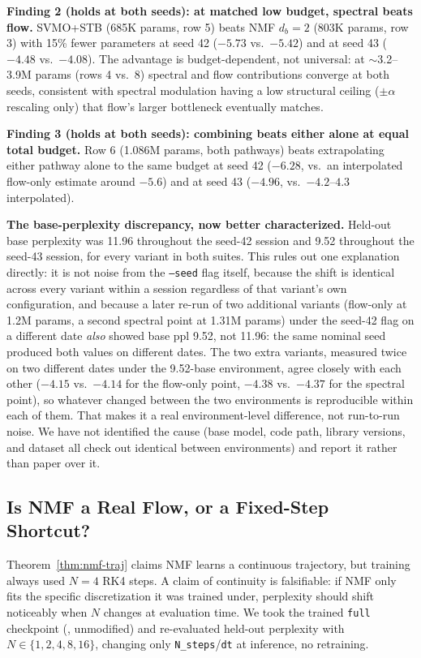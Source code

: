 \documentclass{scpe}
\begin{document}
\textbf{Finding 2 (holds at both seeds): at matched low budget, spectral beats flow.} SVMO+STB (685K params, row 5) beats NMF $d_b{=}2$ (803K params, row 3) with 15\% fewer parameters at seed 42 ($-5.73$ vs.\ $-5.42$) and at seed 43 ($-4.48$ vs.\ $-4.08$). The advantage is budget-dependent, not universal: at $\sim$3.2--3.9M params (rows 4 vs.\ 8) spectral and flow contributions converge at both seeds, consistent with spectral modulation having a low structural ceiling ($\pm\alpha$ rescaling only) that flow's larger bottleneck eventually matches.

\textbf{Finding 3 (holds at both seeds): combining beats either alone at equal total budget.} Row 6 (1.086M params, both pathways) beats extrapolating either pathway alone to the same budget at seed 42 ($-6.28$, vs.\ an interpolated flow-only estimate around $-5.6$) and at seed 43 ($-4.96$, vs.\ $-4.2$--$4.3$ interpolated).

\textbf{The base-perplexity discrepancy, now better characterized.} Held-out base perplexity was 11.96 throughout the seed-42 session and 9.52 throughout the seed-43 session, for every variant in both suites. This rules out one explanation directly: it is not noise from the \texttt{--seed} flag itself, because the shift is identical across every variant within a session regardless of that variant's own configuration, and because a later re-run of two additional variants (flow-only at 1.2M params, a second spectral point at 1.31M params) under the seed-42 flag on a different date \emph{also} showed base ppl 9.52, not 11.96: the same nominal seed produced both values on different dates. The two extra variants, measured twice on two different dates under the 9.52-base environment, agree closely with each other ($-4.15$ vs.\ $-4.14$ for the flow-only point, $-4.38$ vs.\ $-4.37$ for the spectral point), so whatever changed between the two environments is reproducible within each of them. That makes it a real environment-level difference, not run-to-run noise. We have not identified the cause (base model, code path, library versions, and dataset all check out identical between environments) and report it rather than paper over it.

\subsection{Is NMF a Real Flow, or a Fixed-Step Shortcut?}
\label{sec:ode-invariance}

Theorem~\ref{thm:nmf-traj} claims NMF learns a continuous trajectory, but training always used $N{=}4$ RK4 steps. A claim of continuity is falsifiable: if NMF only fits the specific discretization it was trained under, perplexity should shift noticeably when $N$ changes at evaluation time. We took the trained \texttt{full} checkpoint (, unmodified) and re-evaluated held-out perplexity with $N \in \{1,2,4,8,16\}$, changing only \texttt{N\_steps}/\texttt{dt} at inference, no retraining.
\end{document}
